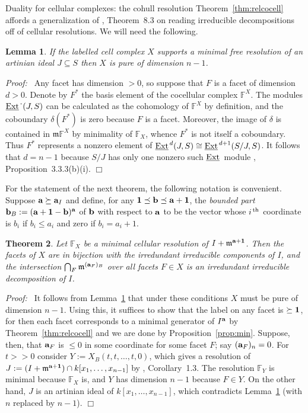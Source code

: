 \documentclass[12pt,leqno]{article}
\newtheorem{thm}{Theorem}[section]
\newtheorem{lemma}[thm]{Lemma}
\def\Ast{{\textstyle \ast}}
\def\hdot{{^{\textstyle \cdot}}}
\def\eext{{{\underline{\rm Ext}}{\scriptscriptstyle \,}}}
\def\aa{{{\rm \bf a}}}
\def\bb{{{\rm \bf b}}}
\def\mm{{\mathfrak m}}
\def\FF{{\mathbb F}}
\begin{document}
\begin{section}{Duality for cellular complexes: the cohull resolution}
Theorem~\ref{thm:relcocell} affords a generalization of \cite{BPS},
Theorem~8.3 on reading irreducible decompositions off of cellular
resolutions.  We will need the following.
\begin{lemma} \label{lemma:pure}
If the labelled cell complex $X$ supports a minimal free resolution of an
artinian ideal $J \subseteq S$ then $X$ is pure of dimension $n-1$.
\end{lemma}
{\it Proof:\ } Any facet has dimension $> 0$, so suppose that $F$ is a
facet of dimension $d > 0$.  Denote by $F^\Ast$ the basis element of the
cocellular complex $\FF^X$.  The modules $\eext\hdot(J,S)$ can be
calculated as the cohomology of $\FF^X$ by definition, and the coboundary
$\delta(F^\Ast)$ is zero because $F$ is a facet.  Moreover, the image of
$\delta$ is contained in $\mm\FF^X$ by minimality of $\FF_X$, whence
$F^\Ast$ is not itself a coboundary.  Thus $F^\Ast$ represents a nonzero
element of $\eext^d(J,S) \cong \eext^{d+1}(S/J,S)$.  It follows that $d =
n-1$ because $S/J$ has only one nonzero such $\eext$ module \cite{BH},
Proposition~3.3.3(b)(i).
%
\hfill
$\Box$
\vskip 2mm 

For the statement of the next theorem, the following notation is
convenient.  Suppose $\aa \succeq \aa_I$ and define, for any ${\bf 1}
\preceq \bb \preceq \aa + {\bf 1}$, the {\it bounded part} $\bb_B := (\aa
+ {\bf 1} - \bb)^\aa$ of $\bb$ with respect to $\aa$ to be the vector
whose $i^{\,\rm th}$ coordinate is $b_i$ if $b_i \leq a_i$ and zero if
$b_i = a_i + 1$.
\begin{thm} \label{thm:irr}
Let $\FF_X$ be a minimal cellular resolution of $I + \mm^{\aa + {\bf
1}}$.  Then the facets of $X$ are in bijection with the irredundant
irreducible components of $I$, and the intersection $\bigcap_F
\mm^{(\aa_F)_B}$ over all facets $F \in X$ is an irredundant irreducible
decomposition of $I$.
\end{thm}
{\it Proof:\ } It follows from Lemma~\ref{lemma:pure} that under these
conditions $X$ must be pure of dimension $n-1$.  Using this, it suffices
to show that the label on any facet is $\succeq {\bf 1}$, for then each
facet corresponds to a minimal generator of $I^\aa$ by
Theorem~\ref{thm:relcocell} and we are done by
Proposition~\ref{prop:min}.  Suppose, then, that $\aa_F$ is $\leq 0$ in
some coordinate for some facet $F$; say $(\aa_F)_n = 0$.  For $t >\!\!>
0$ consider $Y := X_B(t,t,\ldots,t,0)$, which gives a resolution of $J :=
(I + \mm^{\aa + {\bf 1}}) \cap k[x_1,\ldots,x_{n-1}]$ by \cite{BS},
Corollary~1.3.  The resolution $\FF_Y$ is minimal because $\FF_X$ is, and
$Y$ has dimension $n-1$ because $F \in Y$.  On the other hand, $J$ is an
artinian ideal of $k[x_1,\ldots,x_{n-1}]$, which contradicts
Lemma~\ref{lemma:pure} (with $n$ replaced by $n-1$).
%
\hfill
$\Box$
\vskip 2mm


\end{section}
\end{document}

